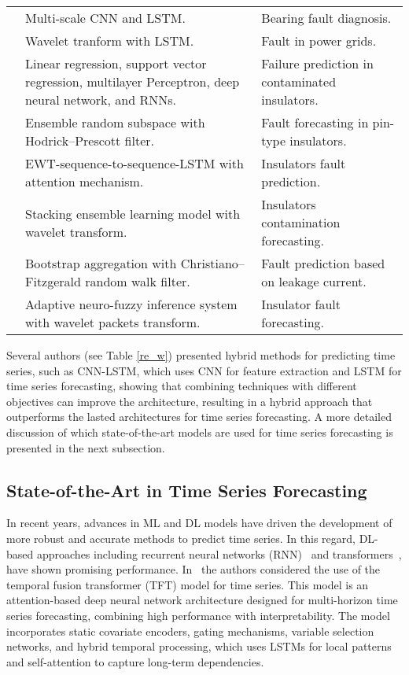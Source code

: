 \begin{table}[]
\begin{tabular}{p{3.6cm}p{6cm}p{5cm}}
\citep{chen2021bearing} & Multi-scale CNN and LSTM. & Bearing fault diagnosis. \\
\citep{s22218323} & Wavelet tranform with LSTM. & Fault %
in power grids.\\
\citep{211126} & Linear regression, support vector regression, multilayer Perceptron, deep neural network, and RNNs. & Failure prediction in contaminated insulators.\\
\citep{SEMAN2023109269} & Ensemble random subspace with Hodrick–Prescott filter.& Fault forecasting in pin-type insulators.\\
\citep{klaar2023optimized} & EWT-sequence-to-sequence-LSTM with attention mechanism. &  Insulators fault prediction.\\
\citep{3076410} & Stacking ensemble learning model with wavelet transform. & Insulators contamination forecasting.\\
\citep{branco2024bootstrap} & Bootstrap aggregation with Christiano–Fitzgerald random walk filter. & Fault prediction based on leakage current.\\
\citep{en13020484} & Adaptive neuro-fuzzy inference system with wavelet packets transform. & Insulator fault forecasting.\\
\hline 
\end{tabular}
\end{table}

Several authors (see Table \ref{re_w}) presented hybrid methods for predicting time series, such as CNN-LSTM, which uses CNN for feature extraction and LSTM for time series forecasting, showing that combining techniques with different objectives can improve the architecture, resulting in a hybrid approach that outperforms the lasted architectures for time series forecasting. A more detailed discussion of which state-of-the-art models are used for time series forecasting is presented in the next subsection.

\subsection{State-of-the-Art in Time Series Forecasting}

In recent years, advances in ML and DL models have driven the development of more robust and accurate methods to predict time series. 
In this regard, DL-based approaches including recurrent neural networks (RNN)~\citep{rnnTS2021} and transformers~\citep{transformerTS2023}, have shown promising performance.
In~\citep{tft2021} the authors considered the use of the temporal fusion transformer (TFT) model for time series. This model is an attention-based deep neural network architecture designed for multi-horizon time series forecasting, combining high performance with interpretability. The model incorporates static covariate encoders, gating mechanisms, variable selection networks, and hybrid temporal processing, which uses LSTMs for local patterns and self-attention to capture long-term dependencies.

